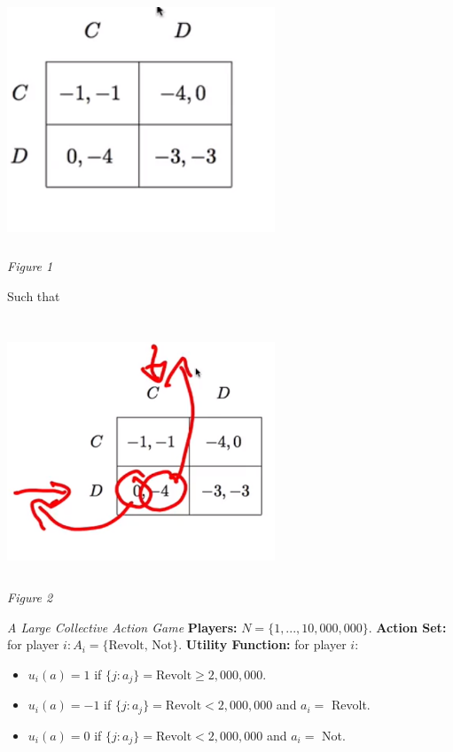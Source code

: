 \documentclass{article}
\begin{document}
\begin{center}
    \includegraphics[width = 8cm, height = 8cm]{IMG_001.png} \\
    \emph{Figure 1}
\end{center}
Such that
\begin{center}
    \includegraphics[width = 8cm, height = 8cm]{IMG_002.png} \\
    \emph{Figure 2}
\end{center}
\vskip 0.1in
\emph{A Large Collective Action Game}
\vskip 0.1in
\textbf{Players:} \(N = \{1, ..., 10,000,000\}\).
\vskip 0.05in
\textbf{Action Set:} for player \(i: A_{i} = \{\text{Revolt, Not} \}\).
\vskip 0.05in 
\textbf{Utility Function:} for player \(i\):
\begin{itemize}
    \item \(u_{i}(a) = 1\) if \(\{j: a_{j}\} = \text{Revolt} \geq 2,000,000\).
    \item \(u_{i}(a) = -1\) if \(\{j: a_{j}\} = \text{Revolt} < 2,000,000\) and \(a_{i} = \) Revolt.
    \item \(u_{i}(a) = 0\) if \(\{j: a_{j}\} = \text{Revolt} < 2,000,000\) and \(a_{i} = \) Not.
\end{itemize}
\end{document}
